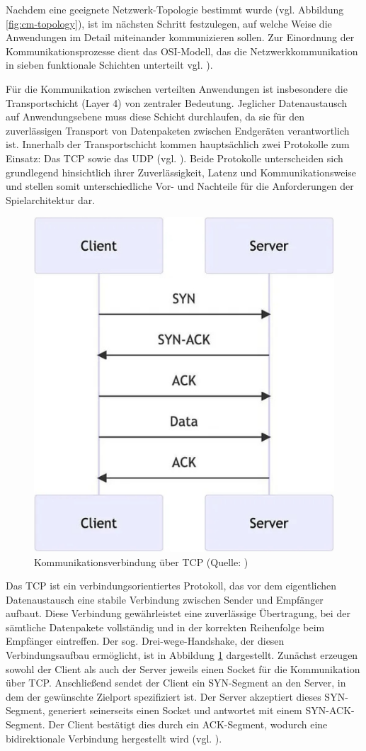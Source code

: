 Nachdem eine geeignete Netzwerk-Topologie bestimmt wurde (vgl. Abbildung \ref{fig:cm-topology}), ist im nächsten Schritt festzulegen, auf welche Weise die Anwendungen im Detail miteinander kommunizieren sollen. Zur Einordnung der Kommunikationsprozesse dient das \ac{OSI}-Modell, das die Netzwerkkommunikation in sieben funktionale Schichten unterteilt vgl. \citealp{a1_osi-modell_2025}).

Für die Kommunikation zwischen verteilten Anwendungen ist insbesondere die Transportschicht (Layer 4) von zentraler Bedeutung. Jeglicher Datenaustausch auf Anwendungsebene muss diese Schicht durchlaufen, da sie für den zuverlässigen Transport von Datenpaketen zwischen Endgeräten verantwortlich ist. Innerhalb der Transportschicht kommen hauptsächlich zwei Protokolle zum Einsatz: Das \ac{TCP} sowie das \ac{UDP} (vgl. \citealp{talkb1nary_transport_nodate}). Beide Protokolle unterscheiden sich grundlegend hinsichtlich ihrer Zuverlässigkeit, Latenz und Kommunikationsweise und stellen somit unterschiedliche Vor- und Nachteile für die Anforderungen der Spielarchitektur dar.

\begin{figure}[ht]
\centering
\includegraphics[width=0.5\linewidth]{content/pictures/TCP-Network.png}
\caption{Kommunikationsverbindung über TCP (Quelle: \citealp{mygames_unity_2024})}
\label{fig:tcp}
\end{figure}

Das \ac{TCP} ist ein verbindungsorientiertes Protokoll, das vor dem eigentlichen Datenaustausch eine stabile Verbindung zwischen Sender und Empfänger aufbaut. Diese Verbindung gewährleistet eine zuverlässige Übertragung, bei der sämtliche Datenpakete vollständig und in der korrekten Reihenfolge beim Empfänger eintreffen. Der sog. Drei-wege-Handshake, der diesen Verbindungsaufbau ermöglicht, ist in Abbildung \ref{fig:tcp} dargestellt. Zunächst erzeugen sowohl der Client als auch der Server jeweils einen Socket für die Kommunikation über \ac{TCP}. Anschließend sendet der Client ein \ac{SYN}-Segment an den Server, in dem der gewünschte Zielport spezifiziert ist. Der Server akzeptiert dieses \ac{SYN}-Segment, generiert seinerseits einen Socket und antwortet mit einem \ac{SYN}-\ac{ACK}-Segment. Der Client bestätigt dies durch ein \ac{ACK}-Segment, wodurch eine bidirektionale Verbindung hergestellt wird (vgl. \citealp{mygames_unity_2024}).

